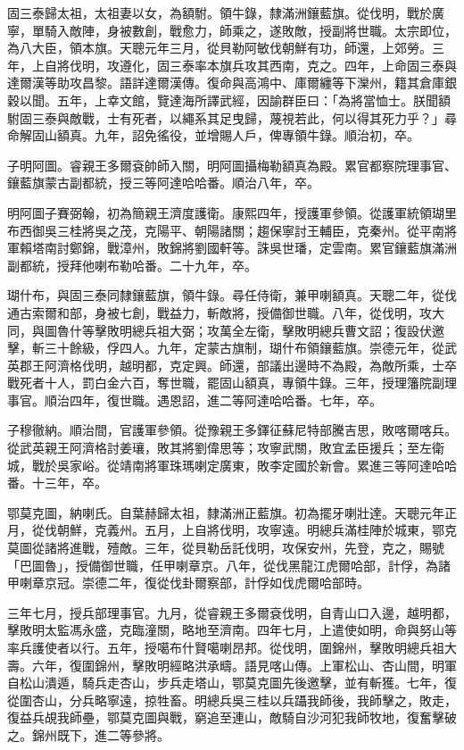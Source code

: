 \begin{pinyinscope}
固三泰歸太祖，太祖妻以女，為額駙。領牛錄，隸滿洲鑲藍旗。從伐明，戰於廣寧，單騎入敵陣，身被數創，戰愈力，師乘之，遂敗敵，授副將世職。太宗即位，為八大臣，領本旗。天聰元年三月，從貝勒阿敏伐朝鮮有功，師還，上郊勞。三年，上自將伐明，攻遵化，固三泰率本旗兵攻其西南，克之。四年，上命固三泰與達爾漢等助攻昌黎。語詳達爾漢傳。復命與高鴻中、庫爾纏等下灤州，籍其倉庫銀穀以聞。五年，上幸文館，覽達海所譯武經，因諭群臣曰：「為將當恤士。朕聞額駙固三泰與敵戰，士有死者，以繩系其足曳歸，蔑視若此，何以得其死力乎？」尋命解固山額真。九年，詔免徭役，並增賜人戶，俾專領牛錄。順治初，卒。

子明阿圖。睿親王多爾袞帥師入關，明阿圖攝梅勒額真為殿。累官都察院理事官、鑲藍旗蒙古副都統，授三等阿達哈哈番。順治八年，卒。

明阿圖子賽弼翰，初為簡親王濟度護衛。康熙四年，授護軍參領。從護軍統領瑚里布西御吳三桂將吳之茂，克陽平、朝陽諸關；趨保寧討王輔臣，克秦州。從平南將軍賴塔南討鄭錦，戰漳州，敗錦將劉國軒等。誅吳世璠，定雲南。累官鑲藍旗滿洲副都統，授拜他喇布勒哈番。二十九年，卒。

瑚什布，與固三泰同隸鑲藍旗，領牛錄。尋任侍衛，兼甲喇額真。天聰二年，從伐通古索爾和部，身被七創，戰益力，斬敵將，授備御世職。八年，從伐明，攻大同，與圖魯什等擊敗明總兵祖大弼；攻萬全左衛，擊敗明總兵曹文詔；復設伏邀擊，斬三十餘級，俘四人。九年，定蒙古旗制，瑚什布領鑲藍旗。崇德元年，從武英郡王阿濟格伐明，越明都，克定興。師還，部議出邊時不為殿，為敵所乘，士卒戰死者十人，罰白金六百，奪世職，罷固山額真，專領牛錄。三年，授理籓院副理事官。順治四年，復世職。遇恩詔，進二等阿達哈哈番。七年，卒。

子穆徹納。順治間，官護軍參領。從豫親王多鐸征蘇尼特部騰吉思，敗喀爾喀兵。從武英親王阿濟格討姜瓖，敗其將劉偉思等；攻寧武關，敗宜孟臣援兵；至左衛城，戰於吳家峪。從靖南將軍珠瑪喇定廣東，敗李定國於新會。累進三等阿達哈哈番。十三年，卒。

鄂莫克圖，納喇氏。自葉赫歸太祖，隸滿洲正藍旗。初為擺牙喇壯達。天聰元年正月，從伐朝鮮，克義州。五月，上自將伐明，攻寧遠。明總兵滿桂陣於城東，鄂克莫圖從諸將進戰，殪敵。三年，從貝勒岳託伐明，攻保安州，先登，克之，賜號「巴圖魯」，授備御世職，任甲喇章京。八年，從伐黑龍江虎爾哈部，計俘，為諸甲喇章京冠。崇德二年，復從伐卦爾察部，計俘如伐虎爾哈部時。

三年七月，授兵部理事官。九月，從睿親王多爾袞伐明，自青山口入邊，越明都，擊敗明太監馮永盛，克臨潼關，略地至濟南。四年七月，上遣使如明，命與努山等率兵護使者以行。五年，授噶布什賢噶喇昂邦。從伐明，圍錦州，擊敗明總兵祖大壽。六年，復圍錦州，擊敗明經略洪承疇。語見喀山傳。上軍松山、杏山間，明軍自松山潰遁，騎兵走杏山，步兵走塔山，鄂莫克圖先後邀擊，並有斬獲。七年，復從圍杏山，分兵略寧遠，掠牲畜。明總兵吳三桂以兵躡我師後，我師擊之，敗走，復益兵覘我師壘，鄂莫克圖與戰，窮追至連山，敵騎自沙河犯我師牧地，復奮擊破之。錦州既下，進二等參將。


\end{pinyinscope}
